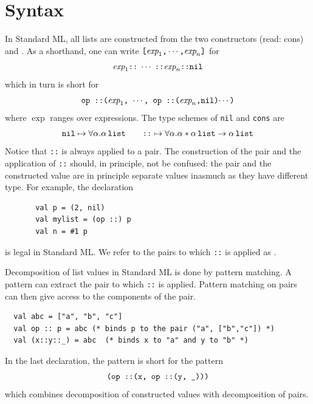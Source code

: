 \documentclass[12pt]{book}
\begin{document}
\section{Syntax}
\label{lsyn.sec}
In Standard ML, all lists are constructed 
from the two constructors \boxml{::} (read: cons)
and .   
As a shorthand, one can write $\hbox{\tt [}\hbox{\it exp}_1\hbox{\tt ,}\cdots
\hbox{\tt ,}\hbox{\it exp}_n\hbox{\tt ]}$ for
$$ \hbox{\it exp}_1\hbox{\tt ::}\; \cdots\; \hbox{\tt ::} \hbox{\it exp}_n\hbox{\tt ::}\hbox{\tt nil}$$
which in turn is short for
$$ \hbox{\tt op ::($\hbox{\it exp}_1$, $\cdots$, op ::($\hbox{\it exp}_n$,nil)$\cdots$)}$$
where $\exp$ ranges over expressions. 
The type schemes of {\tt nil} and {\tt cons} are
$$\hbox{\tt nil}\mapsto\forall\alpha.\alpha\,\hbox{\tt list}\qquad
  \hbox{\tt ::} \mapsto\forall\alpha.\alpha\ast\alpha\,\hbox{\tt list}\to\alpha\,\hbox{\tt list}
$$
Notice that  {\tt ::} is always applied to a pair. The construction
of the pair and the application of {\tt ::} should, in principle,  not be 
confused: the pair and the
constructed value are in principle separate values inasmuch as they have different
type.
For example, the declaration
\begin{verbatim}
       val p = (2, nil)
       val mylist = (op ::) p
       val n = #1 p
\end{verbatim}
is legal in Standard ML. We refer to the pairs to which {\tt ::} is applied
as .

Decomposition of list values in Standard ML is done by 
%
pattern matching.
A pattern can extract the pair to which {\tt ::} is applied. Pattern matching
on pairs can then give access to the components of the pair. 
\begin{verbatim}
  val abc = ["a", "b", "c"]
  val op :: p = abc (* binds p to the pair ("a", ["b","c"]) *)
  val (x::y::_) = abc  (* binds x to "a" and y to "b" *)
\end{verbatim}
In the last declaration, the pattern  is short for the pattern
$$\hbox{\tt (op ::(x, op ::(y, \_)))}$$ which combines decomposition of constructed
values with decomposition of pairs.
\end{document}
